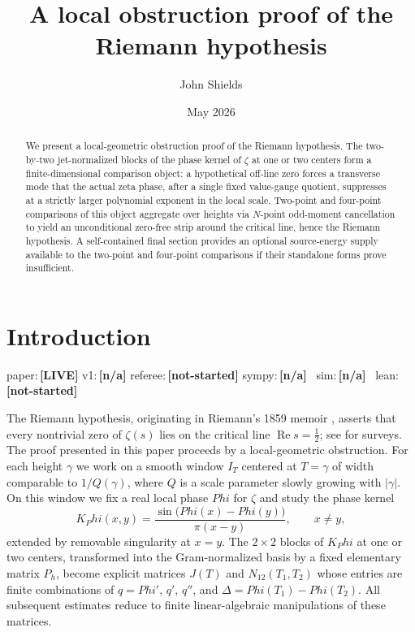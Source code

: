 \documentclass[11pt,a4paper]{amsart}
\title{A local obstruction proof of the Riemann hypothesis}
\author{John Shields}
\date{May 2026}
\def\Phi{Phi}%
\numberwithin{equation}{section}
\theoremstyle{plain}
\theoremstyle{definition}
\newcommand{\Ph}{\Phi}
\newcommand{\Del}{\Delta}
\newcommand{\RePart}{\operatorname{Re}}
\newcommand{\status}[1]{\textbf{\scriptsize[#1]}}
\newcommand{\statuspaper}[1]{\textsf{\footnotesize paper:}\,\status{#1}}
\newcommand{\statusmig}[1]{\textsf{\footnotesize v1:}\,\status{#1}}
\newcommand{\statusreferee}[1]{\textsf{\footnotesize referee:}\,\status{#1}}
\newcommand{\statussympy}[2][\relax]{%
  \textsf{\footnotesize sympy:}\,\status{#2}%
  \ifx\relax#1\else\,\textsf{\scriptsize\texttt{#1}}\fi%
}
\newcommand{\statussim}[2][\relax]{%
  \textsf{\footnotesize sim:}\,\status{#2}%
  \ifx\relax#1\else\,\textsf{\scriptsize\texttt{#1}}\fi%
}
\newcommand{\statuslean}[2][\relax]{%
  \textsf{\footnotesize lean:}\,\status{#2}%
  \ifx\relax#1\else\,\textsf{\scriptsize\texttt{#1}}\fi%
}
\begin{document}
\begin{abstract}
We present a local-geometric obstruction proof of the Riemann hypothesis.
The two-by-two jet-normalized blocks of the phase kernel of \(\zeta\) at
one or two centers form a finite-dimensional comparison object: a
hypothetical off-line zero forces a transverse mode that the actual zeta
phase, after a single fixed value-gauge quotient, suppresses at a strictly
larger polynomial exponent in the local scale.  Two-point and four-point
comparisons of this object aggregate over heights via \(N\)-point
odd-moment cancellation to yield an unconditional zero-free strip around
the critical line, hence the Riemann hypothesis.  A self-contained final
section provides an optional source-energy supply
available to the two-point and four-point comparisons if their standalone
forms prove insufficient.
\end{abstract}

\maketitle

\tableofcontents

\newpage

\section{Introduction}
\label{sec:introduction}
\statuspaper{LIVE}\quad
\statusmig{n/a}\quad
\statusreferee{not-started}\quad
\statussympy{n/a}\quad
\statussim{n/a}\quad
\statuslean{not-started}
\par\medskip

The Riemann hypothesis, originating in Riemann's 1859 memoir
\cite{Riemann1859}, asserts that every nontrivial zero of \(\zeta(s)\) lies
on the critical line \(\RePart s = \tfrac12\); see
\cite{Bombieri2000,Conrey2003,Edwards2001,Titchmarsh1986} for surveys.  The
proof presented in this paper proceeds by a local-geometric obstruction.
For each height \(\gamma\) we work on a smooth window \(I_T\) centered at
\(T=\gamma\) of width comparable to \(1/Q(\gamma)\), where \(Q\) is a
scale parameter slowly growing with \(|\gamma|\).  On this window we fix a
real local phase \(\Ph\) for \(\zeta\) and study the phase kernel
\[
K_\Ph(x,y)=\frac{\sin\bigl(\Ph(x)-\Ph(y)\bigr)}{\pi(x-y)},
\qquad x\ne y,
\]
extended by removable singularity at \(x=y\).  The \(2\times 2\) blocks of
\(K_\Ph\) at one or two centers, transformed into the Gram-normalized
basis by a fixed elementary matrix \(P_h\), become explicit matrices
\(J(T)\) and \(N_{12}(T_1,T_2)\) whose entries are finite combinations of
\(q=\Ph'\), \(q'\), \(q''\), and \(\Del=\Ph(T_1)-\Ph(T_2)\).  All
subsequent estimates reduce to finite linear-algebraic manipulations of
these matrices.
\end{document}
